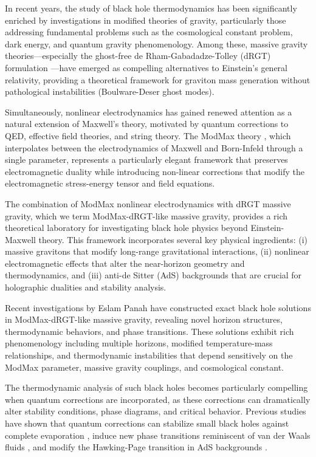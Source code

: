 \documentclass[superscriptaddress, prd, aps,amsmath,amssymb,showpacs,showkeys, onecolumn]{revtex4-2}
\begin{document}
In recent years, the study of black hole thermodynamics has been significantly enriched by investigations in modified theories of gravity, particularly those addressing fundamental problems such as the cosmological constant problem, dark energy, and quantum gravity phenomenology. Among these, massive gravity theories—especially the ghost-free de Rham-Gabadadze-Tolley (dRGT) formulation \cite{deRham2011,Hassan2012}—have emerged as compelling alternatives to Einstein's general relativity, providing a theoretical framework for graviton mass generation without pathological instabilities (Boulware-Deser ghost modes).

Simultaneously, nonlinear electrodynamics has gained renewed attention as a natural extension of Maxwell's theory, motivated by quantum corrections to QED, effective field theories, and string theory. The ModMax theory \cite{Bandos2020,Bandos2021}, which interpolates between the electrodynamics of Maxwell and Born-Infeld through a single parameter, represents a particularly elegant framework that preserves electromagnetic duality while introducing non-linear corrections that modify the electromagnetic stress-energy tensor and field equations.

The combination of ModMax nonlinear electrodynamics with dRGT massive gravity, which we term ModMax-dRGT-like massive gravity, provides a rich theoretical laboratory for investigating black hole physics beyond Einstein-Maxwell theory. This framework incorporates several key physical ingredients: (i) massive gravitons that modify long-range gravitational interactions, (ii) nonlinear electromagnetic effects that alter the near-horizon geometry and thermodynamics, and (iii) anti-de Sitter (AdS) backgrounds that are crucial for holographic dualities and stability analysis.

Recent investigations by Eslam Panah \cite{EslamPanah2025} have constructed exact black hole solutions in ModMax-dRGT-like massive gravity, revealing novel horizon structures, thermodynamic behaviors, and phase transitions. These solutions exhibit rich phenomenology including multiple horizons, modified temperature-mass relationships, and thermodynamic instabilities that depend sensitively on the ModMax parameter, massive gravity couplings, and cosmological constant.

The thermodynamic analysis of such black holes becomes particularly compelling when quantum corrections are incorporated, as these corrections can dramatically alter stability conditions, phase diagrams, and critical behavior. Previous studies have shown that quantum corrections can stabilize small black holes against complete evaporation \cite{Banerjee2008}, induce new phase transitions reminiscent of van der Waals fluids \cite{Kubiznak2012}, and modify the Hawking-Page transition in AdS backgrounds \cite{Witten1998}.
\end{document}
